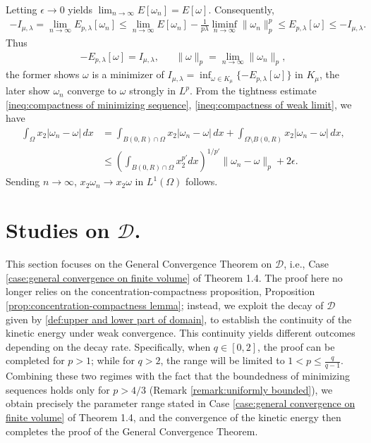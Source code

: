 \documentclass[11pt,letterpaper]{amsart}
\theoremstyle{definition}
\theoremstyle{remark}
\newcommand{\D}{\mathcal{D}}
\renewcommand{\O}{\Omega}
\newcommand{\eps}{\epsilon}
\numberwithin{equation}{section}
\begin{document}
Letting $\eps\to 0$ yields $\lim_{n\to\infty} E[\omega_n] = E[\omega]$. Consequently, 
\begin{align}
    -I_{\mu,\lambda}=\lim_{n\rightarrow\infty}E_{p,\lambda}[\omega_n]\leq \lim_{n\rightarrow\infty}E[\omega_n]-\frac{1}{p\lambda}\liminf_{n\rightarrow\infty}\|\omega_n\|_{p}^p \leq E_{p,\lambda}[\omega]\leq -I_{\mu,\lambda}. \label{eqn:kinetic convergence for half plane and strip}
\end{align}
Thus 
\begin{align*}
    -E_{p,\lambda}[\omega] = I_{\mu,\lambda}, && \|\omega\|_{p}=\lim_{n\rightarrow\infty}\|\omega_n\|_{p},
\end{align*}
the former shows $\omega$ is a minimizer of $I_{\mu,\lambda}=\inf_{\omega\in K_{\mu}}\{-E_{p,\lambda}[\omega]\}$ in $K_{\mu}$, the later show $\omega_n$ converge to $\omega$ strongly in $L^p$. From the tightness estimate \eqref{ineq:compactness of minimizing sequence}, \eqref{ineq:compactness of weak limit}, we have 
\begin{align*}
    \int_{\O} x_2 |\omega_n - \omega| \,dx
    &= \int_{B(0,R)\cap\O} x_2 |\omega_n - \omega| \,dx + \int_{\O \setminus B(0,R)} x_2 |\omega_n - \omega| \,dx, \\
    &\leq \left( \int_{B(0,R)\cap\O}x_2^{p'}dx \right)^{1/p'}\|\omega_n-\omega\|_p + 2\eps.
\end{align*}
Sending $n \to \infty$, $x_2\omega_n \to x_2\omega$ in $L^1(\O)$ follows.

\rightline{$\Box$}


\section{Studies on $\D$.} \label{sec:general convergence theorem for D}

This section focuses on the General Convergence Theorem on $\D$, i.e., Case \ref{case:general convergence on finite volume} of Theorem 1.4. The proof here no longer relies on the concentration-compactness proposition, Proposition \ref{prop:concentration-compactness lemma}; instead, we exploit the decay of $\D$ given by \eqref{def:upper and lower part of domain}, to establish the continuity of the kinetic energy under weak convergence. This continuity yields different outcomes depending on the decay rate. Specifically, when $q\in[0,2]$, the proof can be completed for $p>1$; while for $q>2$, the range will be limited to $1<p \leq \frac{q}{q-1}$. Combining these two regimes with the fact that the boundedness of minimizing sequences holds only for $p>4/3$ (Remark \ref{remark:uniformly bounded}), we obtain precisely the parameter range stated in Case \ref{case:general convergence on finite volume} of Theorem 1.4, and the convergence of the kinetic energy then completes the proof of the General Convergence Theorem.
\end{document}
